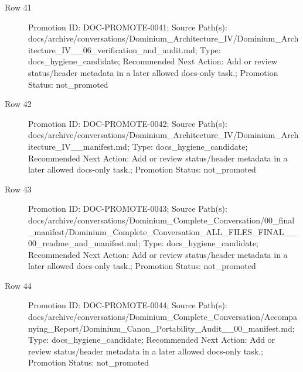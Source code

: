 \documentclass[10.5pt,a4paper,openany]{book}
\begin{document}
\begin{description}
\item[Row 41] Promotion ID: DOC-\allowbreak{}PROMOTE-\allowbreak{}0041; Source Path(s): docs/\allowbreak{}archive/\allowbreak{}conversations/\allowbreak{}Dominium\_\allowbreak{}Architecture\_\allowbreak{}IV/\allowbreak{}Dominium\_\allowbreak{}Architecture\_\allowbreak{}IV\_\allowbreak{}\_\allowbreak{}06\_\allowbreak{}verification\_\allowbreak{}and\_\allowbreak{}audit.\allowbreak{}md; Type: docs\_\allowbreak{}hygiene\_\allowbreak{}candidate; Recommended Next Action: Add or review status/\allowbreak{}header metadata in a later allowed docs-\allowbreak{}only task.\allowbreak{}; Promotion Status: not\_\allowbreak{}promoted
\item[Row 42] Promotion ID: DOC-\allowbreak{}PROMOTE-\allowbreak{}0042; Source Path(s): docs/\allowbreak{}archive/\allowbreak{}conversations/\allowbreak{}Dominium\_\allowbreak{}Architecture\_\allowbreak{}IV/\allowbreak{}Dominium\_\allowbreak{}Architecture\_\allowbreak{}IV\_\allowbreak{}\_\allowbreak{}manifest.\allowbreak{}md; Type: docs\_\allowbreak{}hygiene\_\allowbreak{}candidate; Recommended Next Action: Add or review status/\allowbreak{}header metadata in a later allowed docs-\allowbreak{}only task.\allowbreak{}; Promotion Status: not\_\allowbreak{}promoted
\item[Row 43] Promotion ID: DOC-\allowbreak{}PROMOTE-\allowbreak{}0043; Source Path(s): docs/\allowbreak{}archive/\allowbreak{}conversations/\allowbreak{}Dominium\_\allowbreak{}Complete\_\allowbreak{}Conversation/\allowbreak{}00\_\allowbreak{}final\_\allowbreak{}manifest/\allowbreak{}Dominium\_\allowbreak{}Complete\_\allowbreak{}Conversation\_\allowbreak{}ALL\_\allowbreak{}FILES\_\allowbreak{}FINAL\_\allowbreak{}\_\allowbreak{}00\_\allowbreak{}readme\_\allowbreak{}and\_\allowbreak{}manifest.\allowbreak{}md; Type: docs\_\allowbreak{}hygiene\_\allowbreak{}candidate; Recommended Next Action: Add or review status/\allowbreak{}header metadata in a later allowed docs-\allowbreak{}only task.\allowbreak{}; Promotion Status: not\_\allowbreak{}promoted
\item[Row 44] Promotion ID: DOC-\allowbreak{}PROMOTE-\allowbreak{}0044; Source Path(s): docs/\allowbreak{}archive/\allowbreak{}conversations/\allowbreak{}Dominium\_\allowbreak{}Complete\_\allowbreak{}Conversation/\allowbreak{}Accompanying\_\allowbreak{}Report/\allowbreak{}Dominium\_\allowbreak{}Canon\_\allowbreak{}Portability\_\allowbreak{}Audit\_\allowbreak{}\_\allowbreak{}00\_\allowbreak{}manifest.\allowbreak{}md; Type: docs\_\allowbreak{}hygiene\_\allowbreak{}candidate; Recommended Next Action: Add or review status/\allowbreak{}header metadata in a later allowed docs-\allowbreak{}only task.\allowbreak{}; Promotion Status: not\_\allowbreak{}promoted

\end{description}
\end{document}
